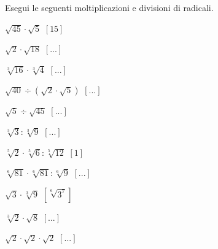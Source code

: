 \begin{esercizio}[\Ast]
 \label{ese:2.32}
Esegui le seguenti moltiplicazioni e divisioni di radicali.
 \begin{multicols}{3}
 \begin{enumeratea}
 \item $\sqrt{45}\cdot \sqrt 5$
  \hfill $\left[15\right]$
 \item $\sqrt 2\cdot \sqrt{18}$
  \hfill $\left[...\right]$
 \item $\sqrt[3]{16}\cdot \sqrt[3]4$
  \hfill $\left[...\right]$
 \item $\sqrt{40}\div(\sqrt{2}\cdot \sqrt{5})$
  \hfill $\left[...\right]$
 \item $\sqrt{5} \div \sqrt{45}$
  \hfill $\left[...\right]$
 \item $\sqrt[3]3:\sqrt[3]9$
  \hfill $\left[...\right]$
 \item $\sqrt[5]2\cdot \sqrt[5]6:\sqrt[5]{12}$
  \hfill $\left[1\right]$
 \item $\sqrt[6]{81}\cdot \sqrt[6]{81}:\sqrt[6]9$
  \hfill $\left[...\right]$
 \item $\sqrt 3\cdot \sqrt[3]9$
  \hfill $\left[\sqrt[6]{3^7}\right]$
 \item $\sqrt[3]2\cdot \sqrt 8$
  \hfill $\left[...\right]$
 \item $\sqrt 2\cdot \sqrt 2\cdot\sqrt 2$
  \hfill $\left[...\right]$
 \end{enumeratea}
 \end{multicols}
\end{esercizio}

